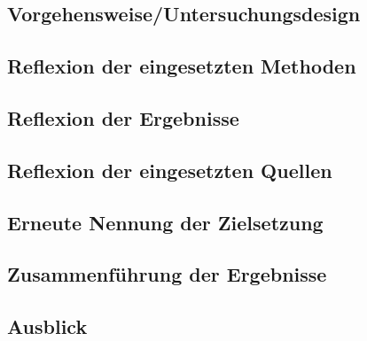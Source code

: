 
\subsection{Vorgehensweise/Untersuchungsdesign}

\subsection{Reflexion der eingesetzten Methoden}

\subsection{Reflexion der Ergebnisse}

\subsection{Reflexion der eingesetzten Quellen}

\newpage
{}

\subsection{Erneute Nennung der Zielsetzung}

\subsection{Zusammenführung der Ergebnisse}

\subsection{Ausblick}

\newpage
